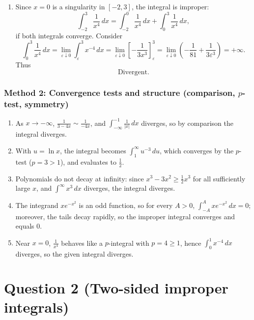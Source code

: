 \documentclass[12pt]{article}
\begin{document}
\begin{enumerate}[label=(\alph*)]
\item Since \(x=0\) is a singularity in \([-2,3]\), the integral is improper:
\[
\int_{-2}^{3}\frac{1}{x^4}\,dx
=
\int_{-2}^{0}\frac{1}{x^4}\,dx + \int_{0}^{3}\frac{1}{x^4}\,dx,
\]
if both integrals converge.
Consider
\[
\int_{0}^{3}\frac{1}{x^4}\,dx
=
\lim_{\varepsilon\downarrow 0}\int_{\varepsilon}^{3} x^{-4}\,dx
=
\lim_{\varepsilon\downarrow 0}\left[-\frac{1}{3x^3}\right]_{\varepsilon}^{3}
=
\lim_{\varepsilon\downarrow 0}\left(-\frac{1}{81}+\frac{1}{3\varepsilon^3}\right)=+\infty.
\]
Thus
\[
\boxed{\text{Divergent.}}
\]
\end{enumerate}

\subsubsection*{Method 2: Convergence tests and structure (comparison, \(p\)-test, symmetry)}

\begin{enumerate}[label=(\alph*)]
\item As \(x\to-\infty\), \(\frac{1}{3-4x}\sim \frac{1}{-4x}\), and
\(\int_{-\infty}^{-1}\frac{1}{|x|}\,dx\) diverges, so by comparison the integral diverges.

\item With \(u=\ln x\), the integral becomes \(\int_{1}^{\infty} u^{-3}\,du\), which converges by the \(p\)-test (\(p=3>1\)), and evaluates to \(\frac12\).

\item Polynomials do not decay at infinity: since \(x^3-3x^2 \ge \frac12 x^3\) for all sufficiently large \(x\), and \(\int^{\infty} x^3\,dx\) diverges, the integral diverges.

\item The integrand \(x e^{-x^2}\) is an odd function, so for every \(A>0\),
\(\int_{-A}^{A} x e^{-x^2}\,dx=0\); moreover, the tails decay rapidly, so the improper integral converges and equals \(0\).

\item Near \(x=0\), \(\frac{1}{x^4}\) behaves like a \(p\)-integral with \(p=4\ge 1\), hence \(\int_{0}^{1}x^{-4}\,dx\) diverges, so the given integral diverges.
\end{enumerate}

\newpage


\section*{Question 2 (Two-sided improper integrals)}
\end{document}
